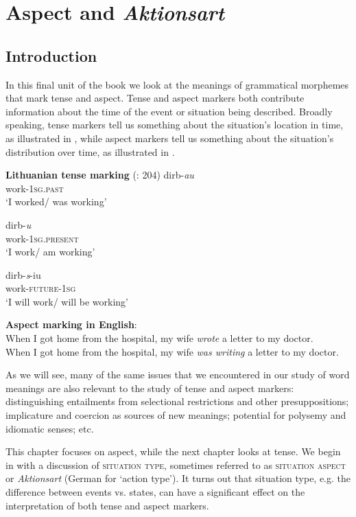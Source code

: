 \chapter{Aspect and \textit{Aktionsart}}\label{sec:20}

\section{Introduction}\label{sec:20.1}

In this final unit of the book we look at the meanings of grammatical morphemes that mark tense and aspect. Tense and aspect markers both contribute information about the time of the event or situation being described. Broadly speaking, tense markers tell us something about the situation’s location in time, as illustrated in , while aspect markers tell us something about the situation’s distribution over time, as illustrated in . 

\ea \label{ex:20.1}
\textbf{Lithuanian tense marking} (\citealt{ChungTimberlake1985}: 204)
\ea 
\gll dirb-\textit{au}\\
work-\textsc{1sg}\textsc{.past} \\
\glt ‘I worked/ was working’

\ex
\gll  dirb-\textit{u}\\
work-\textsc{1sg}\textsc{.present} \\
\glt ‘I work/ am working’

\ex
\gll dirb-\textit{s}-iu\\
work-\textsc{future-}\textsc{1sg} \\
\glt ‘I will work/ will be working’\\
\z
\z

\ea \label{ex:20.2}
\textbf{Aspect marking in English}:\\
\ea  When I got home from the hospital, my wife \textit{wrote} a letter to my doctor.\\
\ex When I got home from the hospital, my wife \textit{was writing} a letter to my doctor.
                       \z
\z


As we will see, many of the same issues that we encountered in our study of word meanings are also relevant to the study of tense and aspect markers: distinguishing entailments from selectional restrictions and other presuppositions; implicature and coercion as sources of new meanings; potential for polysemy and idiomatic senses; etc.



This chapter focuses on aspect, while the next chapter looks at tense. We begin in  with a discussion of \textsc{situation type}, sometimes referred to as \textsc{situation aspect} or \textit{Aktionsart} (German for ‘action type’). It turns out that situation type, e.g. the difference between events vs. states, can have a significant effect on the interpretation of both tense and aspect markers.



